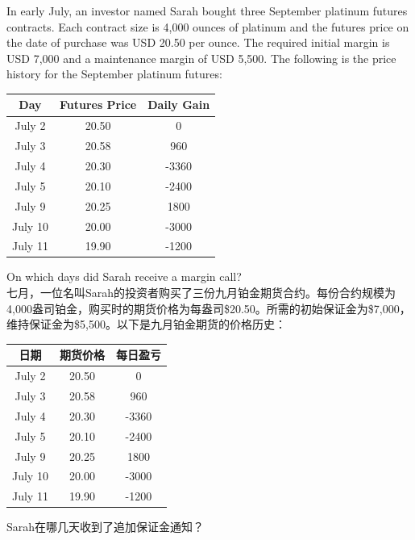 \documentclass{article}
\newcounter{question} %
\begin{document}
    \begin{question}
        In early July, an investor named Sarah bought three September platinum futures contracts. Each contract size is 4,000 ounces of platinum and the futures price on the date of purchase was USD 20.50 per ounce. The required initial margin is USD 7,000 and a maintenance margin of USD 5,500. The following is the price history for the September platinum futures:\\
        \begin{center}
        \begin{tabular}{|c|c|c|}
        \hline
        Day & Futures Price & Daily Gain \\ \hline
        July 2 & 20.50 & 0 \\ \hline
        July 3 & 20.58 & 960 \\ \hline
        July 4 & 20.30 & -3360 \\ \hline
        July 5 & 20.10 & -2400 \\ \hline
        July 9 & 20.25 & 1800 \\ \hline
        July 10 & 20.00 & -3000 \\ \hline
        July 11 & 19.90 & -1200 \\ \hline
        \end{tabular}
        \end{center}
        On which days did Sarah receive a margin call?
        \\七月，一位名叫Sarah的投资者购买了三份九月铂金期货合约。每份合约规模为4,000盎司铂金，购买时的期货价格为每盎司\$20.50。所需的初始保证金为\$7,000，维持保证金为\$5,500。以下是九月铂金期货的价格历史：
        \begin{center}
            \begin{tabular}{|c|c|c|}
            \hline
            日期 & 期货价格 & 每日盈亏 \\ \hline
            July 2 & 20.50 & 0 \\ \hline
            July 3 & 20.58 & 960 \\ \hline
            July 4 & 20.30 & -3360 \\ \hline
            July 5 & 20.10 & -2400 \\ \hline
            July 9 & 20.25 & 1800 \\ \hline
            July 10 & 20.00 & -3000 \\ \hline
            July 11 & 19.90 & -1200 \\ \hline
            \end{tabular}
            \end{center}
            Sarah在哪几天收到了追加保证金通知？
        \end{question}
        
\end{document}
